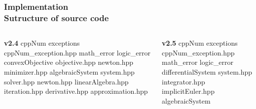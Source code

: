 \documentclass[ucs,10pt]{beamer}
\begin{document}
\begin{frame}
\frametitle{Implementation \\
	\small \color{rwth-blue} Sutructure of source code}
	\begin{columns}
         	\begin{column}{0.5\textwidth}
			\textbf{v2.4} \newline
			cppNum \newline
		  	  exceptions \newline
		    	    cppNum_exception.hpp \newline
		   	    math_error \newline
		    	    logic_error \newline
		  	  convexObjective \newline
		    	    objective.hpp \newline
		    	    newton.hpp \newline
		    	    minimizer.hpp \newline
		  	  algebraicSystem \newline
		    	    system.hpp \newline
		    	    solver.hpp \newline
		    	    newton.hpp \newline
		  	  linearAlgebra.hpp \newline
		  	  iteration.hpp \newline
		  	  derivative.hpp \newline
		  	  approximation.hpp \newline
		\end{column}
		\begin{column}{0.5\textwidth}
    			\textbf{v2.5} \newline
                	cppNum \newline
                  	  exceptions \newline
                   	    cppNum_exception.hpp \newline
               		    math_error \newline
                	    logic_error \newline
                	  differentialSystem \newline
               		    system.hpp \newline
                 	    integrator.hpp \newline
                 	    implicitEuler.hpp \newline
                 	  algebraicSystem \newline

\end{column}
\end{columns}
\end{frame}
\end{document}
